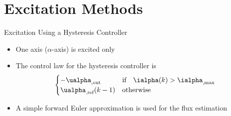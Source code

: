 \documentclass[11pt,aspectratio=169]{beamer}
\begin{document}
\section{Excitation Methods}
\begin{frame}{Excitation Using a Hysteresis Controller}
\vspace{.05cm}
\begin{center}
	\footnotesize 
	
\end{center}
\end{frame}
\begin{frame}
\begin{itemize}
	 \item One axis ($\alpha$-axis) is excited only
	 \item The control law for the hysteresis controller is
	 \begin{align*}
	 \begin{cases}
	 -\ualpha_\scr{,out} &\text{if}\quad \ialpha(k)>\ialpha_\scr{,max}\\
	 \ualpha_\scr{,ref}(k-1) &\text{otherwise}
	 \end{cases}
	 \end{align*}
	\item A simple forward Euler approximation is used for the flux estimation
	\begin{equation*}
	\end{equation*}
\end{itemize}

\end{frame}
\end{document}
